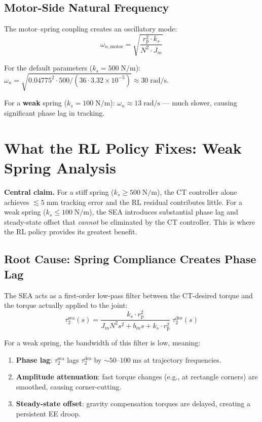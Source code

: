 \documentclass[11pt, a4paper]{article}
\newcommand{\rp}{r_{\mathrm{p}}}
\begin{document}
\subsection{Motor-Side Natural Frequency}

The motor--spring coupling creates an oscillatory mode:
\begin{equation}
  \omega_{n,\text{motor}} = \sqrt{\frac{\rp^2 \cdot k_s}{N^2 \cdot J_m}}
\end{equation}

For the default parameters ($k_s = 500\;\text{N/m}$):
$\omega_{n} = \sqrt{0.04775^2 \cdot 500 / (36 \cdot 3.32 \times 10^{-5})}
\approx 30\;\text{rad/s}$.

For a \textbf{weak} spring ($k_s = 100\;\text{N/m}$):
$\omega_{n} \approx 13\;\text{rad/s}$ --- much slower, causing
significant phase lag in tracking.


\section{What the RL Policy Fixes: Weak Spring Analysis}
\label{sec:weak_spring}

\begin{mdframed}
\textbf{Central claim.}\;
For a stiff spring ($k_s \geq 500\;\text{N/m}$), the CT controller alone
achieves $\lesssim 5\;\text{mm}$ tracking error and the RL residual
contributes little.  For a weak spring ($k_s \leq 100\;\text{N/m}$),
the SEA introduces substantial phase lag and steady-state offset that
\emph{cannot} be eliminated by the CT controller.  This is where the RL
policy provides its greatest benefit.
\end{mdframed}

\subsection{Root Cause: Spring Compliance Creates Phase Lag}

The SEA acts as a first-order low-pass filter between the CT-desired
torque and the torque actually applied to the joint:
\begin{equation}
  \tau_2^{\text{sea}}(s) = \frac{k_s \cdot \rp^2}{J_m N^2 s^2 + b_m s + k_s \cdot \rp^2}
  \;\tau_2^{\text{des}}(s)
  \label{eq:sea_tf}
\end{equation}

For a weak spring, the bandwidth of this filter is low, meaning:
\begin{enumerate}[nosep]
  \item \textbf{Phase lag}: $\tau_2^{\text{sea}}$ lags $\tau_2^{\text{des}}$
        by $\sim 50$--$100\;\text{ms}$ at trajectory frequencies.
  \item \textbf{Amplitude attenuation}: fast torque changes (e.g., at
        rectangle corners) are smoothed, causing corner-cutting.
  \item \textbf{Steady-state offset}: gravity compensation torques are
        delayed, creating a persistent EE droop.
\end{enumerate}
\end{document}
